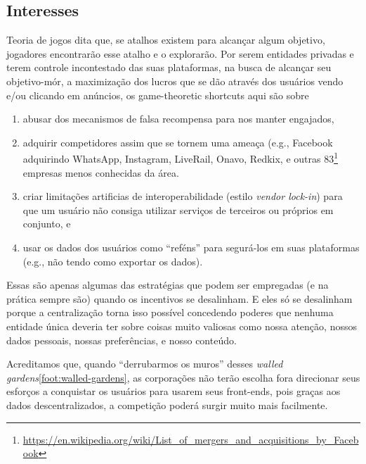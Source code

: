 

\subsection{Interesses}

Teoria de jogos dita que, se atalhos existem para alcançar algum objetivo, jogadores encontrarão esse atalho e o explorarão.
Por serem entidades privadas e terem controle incontestado das suas plataformas, na busca de alcançar seu objetivo-mór, a maximização dos lucros que se dão através dos usuários vendo e/ou clicando em anúncios, os game-theoretic shortcuts aqui são sobre
\begin{enumerate}
    \item abusar dos mecanismos de falsa recompensa  para nos manter engajados,
    \item adquirir competidores assim que se tornem uma ameaça (e.g., Facebook adquirindo WhatsApp, Instagram, LiveRail, Onavo, Redkix, e outras 83\footnote{\url{https://en.wikipedia.org/wiki/List_of_mergers_and_acquisitions_by_Facebook}} empresas menos conhecidas da área.
    \item criar limitações artificias de interoperabilidade (estilo \textit{vendor lock-in}) para que um usuário não consiga utilizar serviços de terceiros ou próprios em conjunto, e
    \item usar os dados dos usuários como ``reféns'' para segurá-los em suas plataformas (e.g., não tendo como exportar os dados).
\end{enumerate}
Essas são apenas algumas das estratégias que podem ser empregadas (e na prática sempre são) quando os incentivos se desalinham.
E eles só se desalinham porque a centralização torna isso possível concedendo poderes que nenhuma entidade única deveria ter sobre coisas muito valiosas como nossa atenção, nossos dados pessoais, nossas preferências, e nosso conteúdo.

Acreditamos que, quando ``derrubarmos os muros'' desses \textit{walled gardens}\ref{foot:walled-gardens}, as corporações não terão escolha fora direcionar seus esforços a conquistar os usuários para usarem seus front-ends, pois graças aos dados descentralizados, a competição poderá surgir muito mais facilmente.

